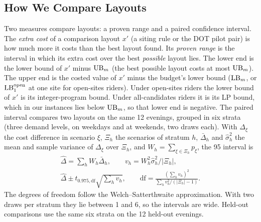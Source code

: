 \subsection{How We Compare Layouts}\label{sec:method:stats}
Two measures compare layouts: a proven range and a paired confidence interval. The \emph{extra cost} of a comparison layout $x'$ (a siting rule or the DOT pilot pair) is how much more it costs than the best layout found. Its \emph{proven range} is the interval in which its extra cost over the best \emph{possible} layout lies. The lower end is the lower bound of $x'$ minus $\mathrm{UB}_m$ (the best possible layout costs at most $\mathrm{UB}_m$). The upper end is the costed value of $x'$ minus the budget's lower bound ($\mathrm{LB}_m$, or $\mathrm{LB}^{\mathrm{open}}_1$ at one site for open-sites riders). Under open-sites riders the lower bound of $x'$ is its integer-program bound. Under all-candidates riders it is its LP bound, which in our instances lies below $\mathrm{UB}_m$, so that lower end is negative. The paired interval compares two layouts on the same 12 evenings, grouped in six strata (three demand levels, on weekdays and at weekends, two draws each). With $\Delta_\xi$ the cost difference in scenario $\xi$, $\Xi_h$ the scenarios of stratum $h$, $\bar\Delta_h$ and $\hat\sigma^2_h$ the mean and sample variance of $\Delta_\xi$ over $\Xi_h$, and $W_h=\sum_{\xi\in\Xi_h}p_\xi$, the 95\pct{} interval is
\begin{equation}\label{eq:stratified}
  \begin{gathered}
  \hat\Delta=\textstyle\sum_hW_h\bar\Delta_h,\qquad v_h=W_h^2\hat\sigma^2_h/|\Xi_h|,\\
  \hat\Delta\pm t_{0.975,\mathrm{df}}\sqrt{\textstyle\sum_hv_h},\qquad \mathrm{df}=\frac{(\sum_hv_h)^2}{\sum_hv_h^2/(|\Xi_h|-1)} .
  \end{gathered}
\end{equation}
The degrees of freedom follow the Welch--Satterthwaite approximation. With two draws per stratum they lie between 1 and 6, so the intervals are wide. Held-out comparisons use the same six strata on the 12 held-out evenings.


